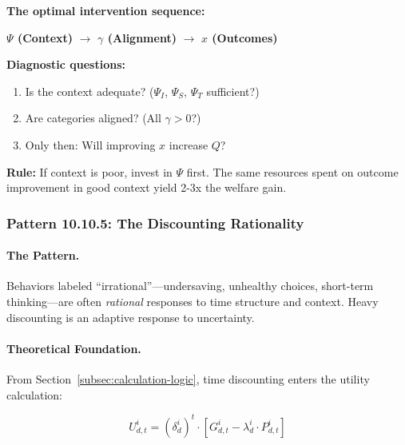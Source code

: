 \begin{tcolorbox}[colback=blue!5!white, colframe=blue!75!black, title=Principle 4: Sequence Matters]
\textbf{The optimal intervention sequence:}

\begin{center}
\textbf{$\Psi$ (Context)} $\longrightarrow$ \textbf{$\gamma$ (Alignment)} $\longrightarrow$ \textbf{$x$ (Outcomes)}
\end{center}

\textbf{Diagnostic questions:}
\begin{enumerate}
\item Is the context adequate? ($\Psi_I$, $\Psi_S$, $\Psi_T$ sufficient?)
\item Are categories aligned? (All $\gamma > 0$?)
\item Only then: Will improving $x$ increase $Q$?
\end{enumerate}

\textbf{Rule:} If context is poor, invest in $\Psi$ first. The same resources 
spent on outcome improvement in good context yield 2-3x the welfare gain.
\end{tcolorbox}

\subsubsection{Pattern 10.10.5: The Discounting Rationality}
\label{subsubsec:discounting-rationality}

\paragraph{The Pattern.}
Behaviors labeled ``irrational''---undersaving, unhealthy choices, 
short-term thinking---are often \emph{rational} responses to time structure
and context. Heavy discounting is an adaptive response to uncertainty.

\paragraph{Theoretical Foundation.}
From Section~\ref{subsec:calculation-logic}, time discounting enters the 
utility calculation:

\begin{equation}
U^i_{d,t} = (\delta^i_d)^t \cdot \left[ G^i_{d,t} - \lambda^i_d \cdot P^i_{d,t} \right]
\end{equation}

